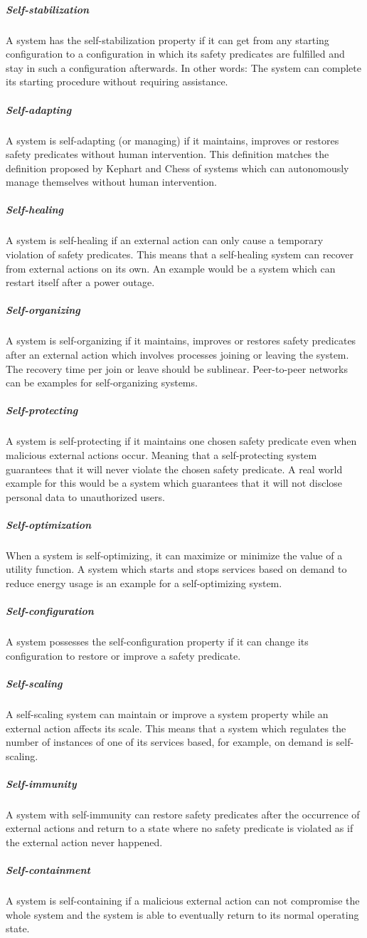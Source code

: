 \subparagraph*{Self-stabilization}
A system has the self-stabilization property if it can get from any starting configuration
to a configuration in which its safety predicates are fulfilled and stay in such a configuration afterwards.
In other words: The system can complete its starting procedure without requiring assistance.
\subparagraph*{Self-adapting}
A system is self-adapting (or managing) if it maintains, improves or restores safety predicates
without human intervention.
This definition matches the definition proposed by Kephart and Chess \cite*{VisionOfAutonomicComputing}
of systems which can autonomously manage themselves without human intervention.
\subparagraph*{Self-healing}
A system is self-healing if an external action can only cause a temporary violation of safety predicates.
This means that a self-healing system can recover from external actions on its own.
An example would be a system which can restart itself after a power outage.
\subparagraph*{Self-organizing}
A system is self-organizing if it maintains, improves or restores safety predicates after an external
action which involves processes joining or leaving the system. The recovery time per join or leave should be sublinear.
Peer-to-peer networks can be examples for self-organizing systems.
\subparagraph*{Self-protecting}
A system is self-protecting if it maintains one chosen safety predicate even when malicious external actions occur.
Meaning that a self-protecting system guarantees that it will never violate the chosen safety predicate.
A real world example for this would be a system which guarantees that it will not disclose personal data to unauthorized users.
\subparagraph*{Self-optimization}
When a system is self-optimizing, it can maximize or minimize the value of a utility function.
A system which starts and stops services based on demand to reduce energy usage is an example for a self-optimizing system.
\subparagraph*{Self-configuration}
A system possesses the self-configuration property if it can change its configuration to restore or improve a safety predicate.
\subparagraph*{Self-scaling}
A self-scaling system can maintain or improve a system property while an external action affects its scale.
This means that a system which regulates the number of instances of one of its services based, for example, on demand is self-scaling.
\subparagraph*{Self-immunity}
A system with self-immunity can restore safety predicates after the occurrence of external actions
and return to a state where no safety predicate is violated as if the external action never happened.
\subparagraph*{Self-containment}
A system is self-containing if a malicious external action can not compromise the whole system
and the system is able to eventually return to its normal operating state.


